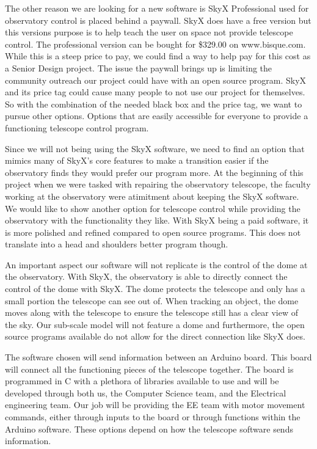 \documentclass[12pt]{report}
\begin{document}
The other reason we are looking for a new software is SkyX Professional used for observatory control is placed behind a paywall. SkyX does have a free version but this versions purpose is to help teach the user on space not provide telescope control. The professional version can be bought for \$329.00 on www.bisque.com. While this is a steep price to pay, we could find a way to help pay for this cost as a Senior Design project. The issue the paywall brings up is limiting the community outreach our project could have with an open source program. SkyX and its price tag could cause many people to not use our project for themselves. So with the combination of the needed black box and the price tag, we want to pursue other options. Options that are easily accessible for everyone to provide a functioning telescope control program.

Since we will not being using the SkyX software, we need to find an option that mimics many of SkyX’s core features to make a transition easier if the observatory finds they would prefer our program more. At the beginning of this project when we were tasked with repairing the observatory telescope, the faculty working at the observatory were atimitment about keeping the SkyX software. We would like to show another option for telescope control while providing the observatory with the functionality they like. With SkyX being a paid software, it is more polished and refined compared to open source programs. This does not translate into a head and shoulders better program though.

An important aspect our software will not replicate is the control of the dome at the observatory. With SkyX, the observatory is able to directly connect the control of the dome with SkyX. The dome protects the telescope and only has a small portion the telescope can see out of. When tracking an object, the dome moves along with the telescope to ensure the telescope still has a clear view of the sky. Our sub-scale model will not feature a dome and furthermore, the open source programs available do not allow for the direct connection like SkyX does.

The software chosen will send information between an Arduino board. This board will connect all the functioning pieces of the telescope together. The board is programmed in C with a plethora of libraries available to use and will be developed through both us, the Computer Science team, and the Electrical engineering team. Our job will be providing the EE team with motor movement commands, either through inputs to the board or through functions within the Arduino software. These options depend on how the telescope software sends information.
\end{document}
